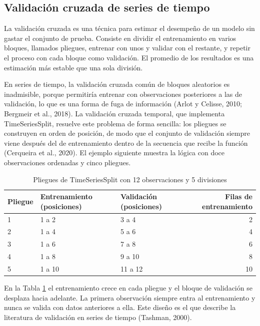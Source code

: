 \subsection{Validación cruzada de series de tiempo}
La validación cruzada es una técnica para estimar el desempeño de un modelo sin gastar el conjunto de prueba. Consiste en dividir el entrenamiento en varios bloques, llamados pliegues, entrenar con unos y validar con el restante, y repetir el proceso con cada bloque como validación. El promedio de los resultados es una estimación más estable que una sola división.

En series de tiempo, la validación cruzada común de bloques aleatorios es inadmisible, porque permitiría entrenar con observaciones posteriores a las de validación, lo que es una forma de fuga de información (Arlot y Celisse, 2010; Bergmeir et al., 2018). La validación cruzada temporal, que implementa TimeSeriesSplit, resuelve este problema de forma sencilla: los pliegues se construyen en orden de posición, de modo que el conjunto de validación siempre viene después del de entrenamiento dentro de la secuencia que recibe la función (Cerqueira et al., 2020). El ejemplo siguiente muestra la lógica con doce observaciones ordenadas y cinco pliegues.

\begin{table}[H]
\centering
\caption{Pliegues de TimeSeriesSplit con 12 observaciones y 5 divisiones}
\label{tab:met_tscv}
\small
\begin{tabularx}{\textwidth}{Xp{4.6cm}Xr}
\toprule
\textbf{Pliegue} & \textbf{Entrenamiento (posiciones)} & \textbf{Validación (posiciones)} & \textbf{Filas de entrenamiento} \\
\midrule
1 & 1 a 2 & 3 a 4 & 2 \\
2 & 1 a 4 & 5 a 6 & 4 \\
3 & 1 a 6 & 7 a 8 & 6 \\
4 & 1 a 8 & 9 a 10 & 8 \\
5 & 1 a 10 & 11 a 12 & 10 \\
\bottomrule
\end{tabularx}
\end{table}

En la Tabla \ref{tab:met_tscv} el entrenamiento crece en cada pliegue y el bloque de validación se desplaza hacia adelante. La primera observación siempre entra al entrenamiento y nunca se valida con datos anteriores a ella. Este diseño es el que describe la literatura de validación en series de tiempo (Tashman, 2000).

